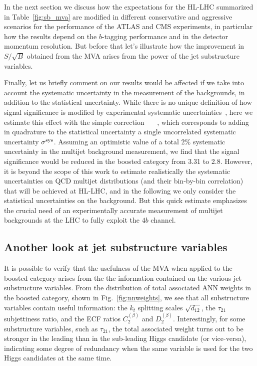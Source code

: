 In the next section we discuss how the expectations for the HL-LHC
summarized in  Table~\ref{fig:sb_mva} are modified in different
conservative and aggressive scenarios for the performance of the
ATLAS and CMS experiments, in particular how the results depend
on the $b$-tagging performance and in the detector momentum
resolution.
%
But before that let's illustrate how the improvement in $S/\sqrt{B}$
obtained from the MVA arises from the power of the jet
substructure variables.

Finally, let us briefly comment on our results would be affected
if we take into account the systematic uncertainty in the measurement
of the backgrounds, in addition to the statistical uncertainty.
%
While there is no unique definition of how signal significance is modified
by experimental systematic uncertainties~\cite{Bityukov:2002eq}, here we estimate
this effect with the simple correction
\be
{} \, \to \,   \, ,
\ee
which corresponds to adding in quadrature to the statistical uncertainty  a single
uncorrelated systematic uncertainty $\sigma^{\rm sys}$.
%
Assuming an optimistic value of a total 2\% systematic uncertainty in the
multijet background measurement, we find that the signal significance would be
reduced in the boosted category from 3.31 to 2.8.
%
However, it is beyond the scope of this work to estimate realistically
the systematic uncertainties on QCD multijet distributions (and their bin-by-bin correlation)
that will be achieved at HL-LHC, and in the following we only consider the statistical
uncertainties on the background.
%
But this quick estimate emphasizes the crucial need of an experimentally accurate
measurement of multijet backgrounds at the LHC to fully exploit the $4b$ channel.


\subsection{Another look at jet substructure variables}

It is possible to verify that the usefulness of the MVA when
applied to the boosted category arises from the 
the information contained on the various jet substructure variables.
%
From the distribution of total associated ANN weights in the
boosted category, shown in Fig.~\ref{fig:nnweights}, we see that
all substructure variables contain useful information:
the $k_t$ splitting scales $\sqrt{d_{12}}$,
the $\tau_{21}$ subjettiness ratio, and the ECF ratios
$C_2^{(\beta)}$ and $D_2^{(\beta)}$.
%
Interestingly, for some substructure variables, such as $\tau_{21}$,
the total associated weight turns out to be stronger in the leading
than in the sub-leading Higgs candidate (or vice-versa), indicating some
degree of redundancy when the same variable is used for the two Higgs candidates
at the same time.


